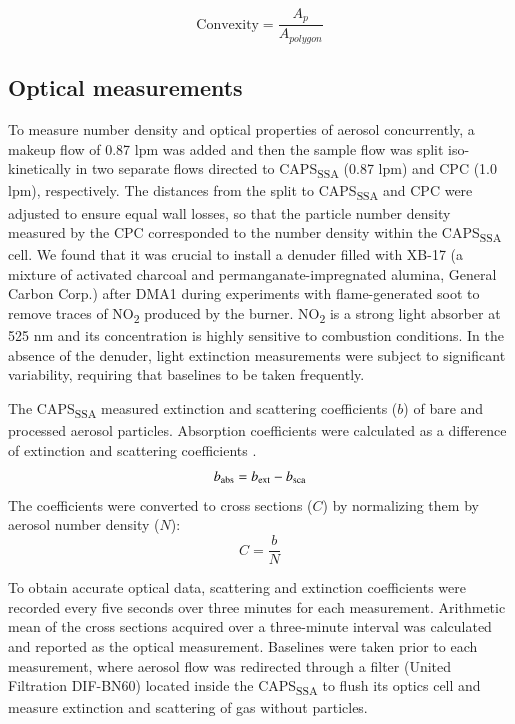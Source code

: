 \documentclass[12pt,authoryear]{elsarticle}
\begin{document}
\begin{equation}
    \mathrm{Convexity}=\frac{A_p}{A_{polygon}}
    \label{eq:convexity}
\end{equation}

\subsection{Optical measurements}

To measure number density and optical properties of aerosol concurrently, a makeup flow of 0.87 lpm was added and then the sample flow was split iso-kinetically in two separate flows directed to CAPS\textsubscript{SSA} (0.87 lpm) and CPC (1.0 lpm), respectively. The distances from the split to CAPS\textsubscript{SSA} and CPC were adjusted to ensure equal wall losses, so that the particle number density measured by the CPC corresponded to the number density within the CAPS\textsubscript{SSA} cell. We found that it was crucial to install a denuder filled with XB-17 (a mixture of activated charcoal and permanganate-impregnated alumina, General Carbon Corp.) after DMA1 during experiments with flame-generated soot to remove traces of NO\textsubscript{2} produced by the burner. NO\textsubscript{2} is a strong light absorber at 525 nm and its concentration is highly sensitive to combustion conditions. In the absence of the denuder, light extinction measurements were subject to significant variability, requiring that baselines to be taken frequently.

The CAPS\textsubscript{SSA} measured extinction and scattering coefficients ($b$) of bare and processed aerosol particles. Absorption coefficients were calculated as a difference of extinction and scattering coefficients \citep{RN7,RN50}.
\begin{equation}
b_{\rm abs}=b_{\rm ext}-b_{\rm sca}
\label{eq:babs}
\end{equation}
The coefficients were converted to cross sections ($C$) by normalizing them by aerosol number density ($N$):
\begin{equation}
C=\frac{b}{N}
\label{eq:copt}
\end{equation}

To obtain accurate optical data, scattering and extinction coefficients were recorded every five seconds over three minutes for each measurement. Arithmetic mean of the cross sections acquired over a three-minute interval was calculated and reported as the optical measurement. Baselines were taken prior to each measurement, where aerosol flow was redirected through a filter (United Filtration DIF-BN60) located inside the CAPS\textsubscript{SSA} to flush its optics cell and measure extinction and scattering of gas without particles.
\end{document}
